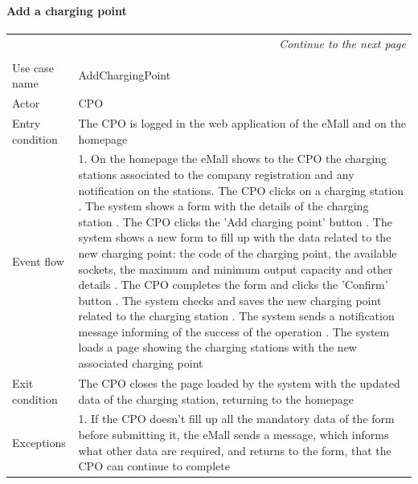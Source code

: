 \paragraph{Add a charging point}
\begin{center}
    \begin{longtable}{p{4cm} p{11cm}}
    \multicolumn{2}{r}{\itshape{Continue to the next page}}\\
    \endfoot 
    \\
    \endlastfoot
    \hline
     Use case name &  AddChargingPoint\\
     \hline
     Actor & CPO \\
     \hline
     Entry condition & The CPO is logged in the web application of the eMall and on the homepage \\
     \hline
     Event flow & 1. On the homepage the eMall shows to the CPO the charging stations                   associated to the company registration and any notification on the                 stations\newline
                    2. The CPO clicks on a charging station \newline 
                    3. The system shows a form with the details of the charging station \newline
                    4. The CPO clicks the 'Add charging point' button \newline
                    5. The system shows a new form to fill up with the data related to the new charging point: the code of the charging point, the available sockets, the maximum and minimum output capacity and other details \newline
                    6. The CPO completes the form and clicks the 'Confirm' button \newline
                    7. The system checks and saves the new charging point related to the charging station \newline
                    8. The system sends a notification message informing of the success of the operation \newline
                    9. The system loads a page showing the charging stations with the new associated charging point\\
     \hline
     Exit condition &  The CPO closes the page loaded by the system with the updated data of the charging station, returning to the homepage \\
     \hline
     Exceptions &   1. If the CPO doesn't fill up all the mandatory data of the form                    before submitting it, the eMall sends a message, which informs                     what other data are required, and returns to the form, that the                    CPO can continue to complete \newline

\end{longtable}
\end{center}
